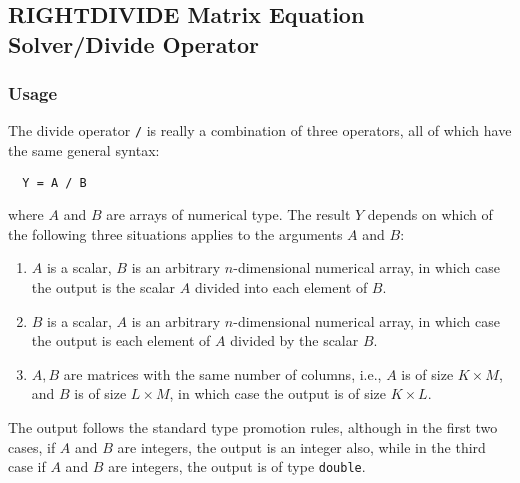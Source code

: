 %
%
%
\subsection{RIGHTDIVIDE Matrix Equation Solver/Divide Operator}
\subsubsection{Usage}
The divide operator \verb|/| is really a combination of three
operators, all of which have the same general syntax:
\begin{verbatim}
  Y = A / B
\end{verbatim}
where $A$ and $B$ are arrays of numerical type.  The result $Y$ depends
on which of the following three situations applies to the arguments
$A$ and $B$:
\begin{enumerate}
  \item $A$ is a scalar, $B$ is an arbitrary $n$-dimensional numerical array, in which case the output is the scalar $A$ divided into each element of $B$.
  \item $B$ is a scalar, $A$ is an arbitrary $n$-dimensional numerical array, in which case the output is each element of $A$ divided by the scalar $B$.
  \item $A,B$ are matrices with the same number of columns, i.e., $A$ is of size $K \times M$, and $B$ is of size $L \times M$, in which case the output is of size $K \times L$.
\end{enumerate}
The output follows the standard type promotion rules, although in the first two cases, if $A$ and $B$ are integers, the output is an integer also, while in the third case if $A$ and $B$ are integers, the output is of type \verb|double|.

